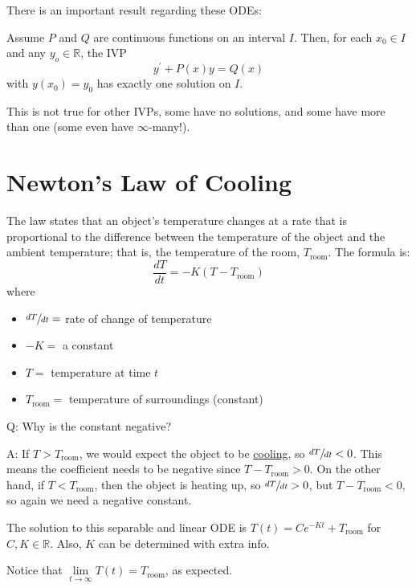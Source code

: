 There is an important result regarding these ODEs:
\begin{Theorem}{}{}
    Assume $ P $ and $ Q $ are continuous functions on an interval $ I $.
    Then, for each $ x_0\in I $ and any $ y_o\in\mathbb{R} $, the IVP
    \[ y^\prime +P(x)y=Q(x) \]
    with $ y(x_0)=y_0 $ has exactly one solution on $ I $.
\end{Theorem}

\begin{Remark}{}{}
    This is not true for other IVPs, some have no solutions, and some have more than
    one (some even have $ \infty $-many!).
\end{Remark}

\setcounter{section}{6}
\section{Newton's Law of Cooling}
The law states that an object's temperature changes at a rate that is proportional
to the difference between the temperature of
the object and the ambient temperature; that is, the temperature of the room,
$ T_{\text{room}} $. The formula is:
\[ \frac{dT}{dt}=-K\left( T-T_{\text{room}} \right)  \]
where
\begin{itemize}
    \item $ \sfrac{dT}{dt} = $ rate of change of temperature
    \item $ -K =$ a constant
    \item $ T= $ temperature at time $ t $
    \item $ T_{\text{room}}= $ temperature of surroundings (constant)
\end{itemize}
Q\@: Why is the constant negative?

A\@: If $ T>T_{\text{room}} $, we would expect the object to be \underline{cooling},
so $ \sfrac{dT}{dt} <0 $. This means the coefficient needs to be negative since
$ T-T_{\text{room}}>0 $. On the other hand, if $ T<T_{\text{room}} $,
then the object is heating up, so $ \sfrac{dT}{dt}>0 $, but
$ T-T_{\text{room}}<0 $, so again we need a negative constant.

\begin{Exercise}{}{}
    The solution to this separable and linear ODE is
    $ \displaystyle  T(t)=Ce^{-Kt}+T_{\text{room}} $
    for $ C,K\in\mathbb{R} $. Also, $ K $ can be determined with extra info.
\end{Exercise}

Notice that $ \lim\limits_{{t} \to {\infty}} T(t)=T_{\text{room}} $,
as expected.


